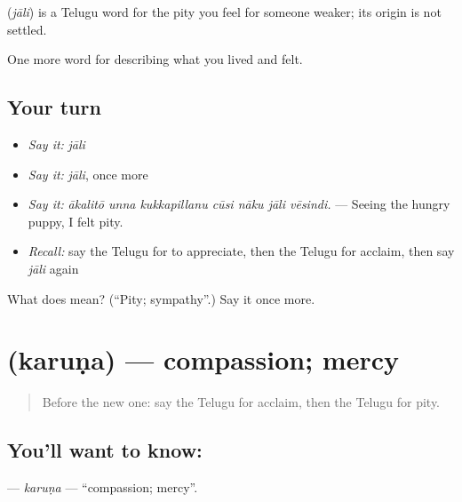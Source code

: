 \begin{cousinweb}
\textbf{} (\emph{jāli}) is a Telugu word for the pity you feel for someone weaker; its origin is not settled.
\end{cousinweb}

\begin{grammarlens}[title={What you've built}]
One more word for describing what you lived and felt.
\end{grammarlens}

\subsection*{Your turn}
\begin{itemize}
\raggedright
  \item \emph{Say it:} \emph{jāli}
  \item \emph{Say it:} \emph{jāli}, once more
  \item \emph{Say it:} \emph{ākalitō unna kukkapillanu cūsi nāku jāli vēsindi.} — Seeing the hungry puppy, I felt pity.
  \item \emph{Recall:} say the Telugu for to appreciate, then the Telugu for acclaim, then say \emph{jāli} again
\end{itemize}

\begin{tcolorbox}[breakable,colback=teal!4,colframe=teal!35!black,title={Before you move on}]
What does  mean? (\textquotedblleft{}Pity; sympathy\textquotedblright{}.) Say it once more.
\end{tcolorbox}
\section[\texorpdfstring{\te{కరుణ} (karuṇa)}{కరుణ (karuṇa)}]{ (karuṇa) — compassion; mercy}

\label{lesson:TE-C505-karuna}



\begin{quote}
Before the new one: say the Telugu for acclaim, then the Telugu for pity.
\end{quote}

\subsection*{You'll want to know: }
\textbf{} — \emph{karuṇa} — \textquotedblleft{}compassion; mercy\textquotedblright{}.

